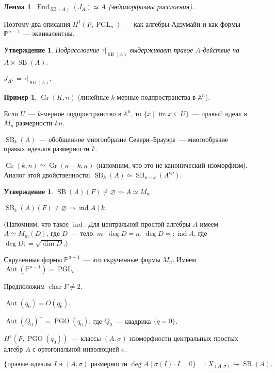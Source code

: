 \documentclass[a4paper]{article}
\DeclareMathOperator{\PGO}{PGO}
\DeclareMathOperator{\ind}{ind}
\DeclareMathOperator{\End}{End}
\DeclareMathOperator{\Gr}{Gr}
\DeclareMathOperator{\Aut}{Aut}
\DeclareMathOperator{\PGL}{PGL}
\DeclareMathOperator{\fchar}{char}
\DeclareMathOperator{\SB}{SB}
\DeclareMathOperator{\im}{im}
\renewcommand{\emptyset}{\varnothing}
\newcommand{\rdfn}{=\mathrel{\mathop:}}
\newcommand{\dfn}{\mathrel{\mathop:}=}
\newcommand{\isom}{\simeq}
\newtheorem{lemma}[theorem]{Лемма}
\newtheorem{proposition}[theorem]{Утверждение}
\theoremstyle{definition}
\newtheorem{example}[theorem]{Пример}
\begin{document}
\begin{lemma}
$\End_{\SB (A)} (J_A) \isom A$ (эндоморфизмы расслоения).
\end{lemma}
Поэтому два описания $H^1(F,\PGL_n)$~--- как алгебры Адзумайи и как
формы $\mathbb P^{n-1}$~--- эквивалентны.

\begin{proposition}
Подрасслоение $\left.\tau\right|_{\SB(A)}$ выдерживает правое
$A$-действие на $A\times \SB(A)$.

$J_A \dfn \left.\tau\right|_{\SB (A)}$.
\end{proposition}

\begin{example}
$\Gr (K,n)$ (линейные $k$-мерные подпространства в $\mathbb{A}^n$).

Если $U$~--- $k$-мерное подпространство в $\mathbb{A}^n$, то
$\{ x \mid \im x \subseteq U \}$~--- правый идеал в $M_n$ размерности
$kn$.

$\SB_k (A)$~--- обобщенное многообразие Севери--Брауэра~--- многообразие
правых идеалов размерности $k$.
\end{example}

$\Gr (k,n) \isom \Gr (n-k, n)$ (напомним, что это не канонический
изоморфизм). Аналог этой двойственности: $\SB_k (A) \isom \SB_{n-k}
(A^{op})$.

\begin{proposition}
$\SB (A) (F) \ne \emptyset \Rightarrow A \isom M_n$.

$\SB_k (A) (F) \ne \emptyset \Rightarrow \ind A \mid k$.
\end{proposition}

(Напомним, что такое $\ind$. Для центральной простой алгебры $A$ имеем
$A \isom M_m (D)$, где $D$~--- тело. $m \cdot \deg D = n$. $\deg D \rdfn
\ind A$, где $\deg D \dfn \sqrt{\dim D}$.)

Скрученные формы $\mathbb{P}^{n-1}$~--- это скрученные формы
$M_n$. Имеем $\Aut (\mathbb{P}^{n-1}) = \PGL_n$.

Предположим $\fchar F \ne 2$.

$\Aut(q_0) = O(q_0)$.

$\Aut (Q_0)^+ = \PGO (q_0)$, где $Q_0$~--- квадрика $\{ q = 0 \}$.

$H^1 (F, \PGO (q_0))$~--- классы $(A,\sigma)$ изоморфности центральных
простых алгебр $A$ с ортогональной инволюцией $\sigma$.


\[ \{ \text{правые идеалы }I\text{ в }(A,\sigma)\text{ размерности }\deg A \mid \sigma (I) \cdot I = 0 \} \rdfn X_{(A,\sigma)} \hookrightarrow \SB(A). \]
\end{document}
